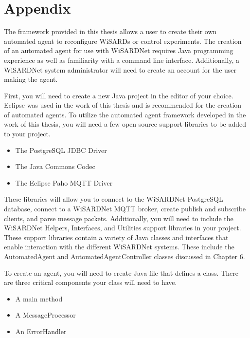 
\chapter{Appendix}
\label{Appendix:agent}
\lhead{}

The framework provided in this thesis allows a user to create their own automated agent to reconfigure WiSARDs or control experiments. The creation of an automated agent for use with WiSARDNet requires Java programming experience as well as familiarity with a command line interface. Additionally, a WiSARDNet system administrator will need to create an account for the user making the agent.

First, you will need to create a new Java project in the editor of your choice. Eclipse was used in the work of this thesis and is recommended for the creation of automated agents. To utilize the automated agent framework developed in the work of this thesis, you will need a few open source support libraries to be added to your project.

\begin{itemize}
	\item The PostgreSQL JDBC Driver
	\item The Java Commons Codec 
	\item The Eclipse Paho MQTT Driver
\end{itemize}

These libraries will allow you to connect to the WiSARDNet PostgreSQL database, connect to a WiSARDNet MQTT broker, create publish and subscribe clients, and parse message packets. Additionally, you will need to include the WiSARDNet Helpers, Interfaces, and Utilities support libraries in your project. These support libraries contain a variety of Java classes and interfaces that enable interaction with the different WiSARDNet systems. These include the AutomatedAgent and AutomatedAgentController classes discussed in Chapter 6. 

To create an agent, you will need to create Java file that defines a class. There are three critical components your class will need to have.

\begin{itemize}
	\item A main method
	\item A MessageProcessor
	\item An ErrorHandler
\end{itemize}

